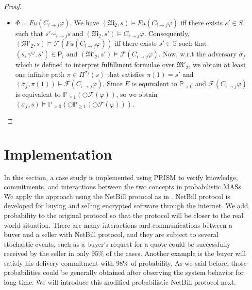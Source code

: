 \begin{proof}
\begin{itemize}
\item $\Phi = Fu(C_{i \rightarrow j} \varphi)$. We have
$(\mathfrak{M_2},s)\models Fu(C_{i\rightarrow j}\varphi)$ iff there exists $s'\in S$ such that $s'\sim_{i \rightarrow j}s~ \text{and~}(\mathfrak{M_2},s')\models C_{i \rightarrow j}\varphi$.
Consequently, $(\mathfrak{M'_2},s)\models \mathscr{F}(Fu(C_{i\rightarrow j}\varphi))$ iff there exists $s' \in \mathbb{S}$ such that $(s,\gamma^{ij},s') \in \textsf{P}_t$ and
$(\mathfrak{M'_2},s') \models \mathscr{F}(C_{i \rightarrow j}\varphi)$. Now, w.r.t the adversary $\sigma_f$ which is defined to interpret fulfillment formulae over $\mathfrak{M'_2}$, we obtain at least one infinite path $\pi \in \Pi^{\sigma_f}(s)$ that satisfies $\pi(1)=s'$ and
$(\sigma_f,\pi(1))\models \mathscr{F}(C_{i \rightarrow j}\varphi)$. Since $E$ is equivalent to $\mathbb{P}_{>0}$ and $\mathscr{F}(C_{i \rightarrow j}\varphi)$ is equivalent to
$\mathbb{P}_{\geq1}(\bigcirc\mathscr{F}(\varphi))$, so we obtain $(\sigma_f,s)\models \mathbb{P}_{>0}(\bigcirc\mathbb{P}_{\geq 1}(\bigcirc \mathscr{F}(\varphi)))$.



\end{itemize}

\end{proof}


\section{Implementation}\label{sec:Case-Study-cha4}
In this section, a case study is implemented using
PRISM \cite{Kwiatkowska2002} to verify knowledge, commitments,
and interactions between the two concepts in probabilistic MASs. We
apply the approach using the NetBill protocol
as in \cite{El-Menshawy2013a,Mallya2007,Yolum2002}. NetBill protocol
is developed for buying and selling encrypted software through the internet. We add probability to the original protocol so that the protocol will be
closer to the real world situation. There are many interactions
and communications between a buyer and a seller with NetBill protocol, and they are subject to several stochastic events, such as a buyer's request
for a quote could be successfully received by the seller in only
95\% of the cases. Another example is the buyer will satisfy his
delivery commitment with 98\% of probability. As we said before, those probabilities could be generally obtained after observing the system behavior for long time. We will introduce this modified probabilistic NetBill protocol next.


